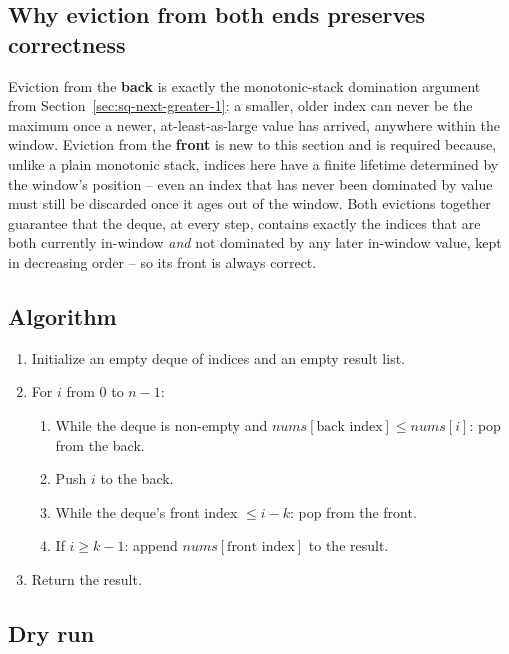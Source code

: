 \subsection*{Why eviction from both ends preserves correctness}

Eviction from the \textbf{back} is exactly the monotonic-stack domination
argument from Section~\ref{sec:sq-next-greater-1}: a smaller, older index
can never be the maximum once a newer, at-least-as-large value has
arrived, anywhere within the window. Eviction from the \textbf{front} is
new to this section and is required because, unlike a plain monotonic
stack, indices here have a finite lifetime determined by the window's
position -- even an index that has never been dominated by value must
still be discarded once it ages out of the window. Both evictions
together guarantee that the deque, at every step, contains exactly the
indices that are both currently in-window \emph{and} not dominated by
any later in-window value, kept in decreasing order -- so its front is
always correct.

\subsection*{Algorithm}

\begin{enumerate}
  \item Initialize an empty deque of indices and an empty result list.
  \item For $i$ from $0$ to $n-1$:
  \begin{enumerate}
    \item While the deque is non-empty and
          $\textit{nums}[\text{back index}] \le \textit{nums}[i]$: pop
          from the back.
    \item Push $i$ to the back.
    \item While the deque's front index $\le i-k$: pop from the front.
    \item If $i \ge k-1$: append $\textit{nums}[\text{front index}]$ to
          the result.
  \end{enumerate}
  \item Return the result.
\end{enumerate}

\subsection*{Dry run}


